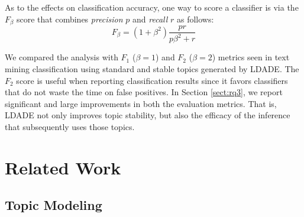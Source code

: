 \documentclass[twocolumn,5p,sort&compress]{elsarticle}
\newcommand{\tion}[1]{\ref{sect:#1}}
\theoremstyle{break}
\begin{document}
As to the effects on classification accuracy, 
one way to score a classifier is via the $F_\beta$ score that combines
{\em precision} $p$ and {\em recall} $r$ as follows:
\begin{equation}\label{eq:f}
F_{\beta} = (1+\beta^2) \frac{pr}{p\beta^2 + r}
\end{equation}

We compared the analysis with $F_1$ ($\beta=1$) and $F_2$ ($\beta=2$) metrics seen in text mining classification using standard and stable topics generated by LDADE. The $F_2$ score is useful when reporting classification results
since it favors classifiers that do not waste the time on false positives. In Section \tion{rq3}, we report 
significant and large improvements in both the evaluation metrics. That is, LDADE not only improves topic stability, but also the efficacy
of the inference that subsequently uses those topics.

\section{Related Work}
\label{sect:related}

\subsection{Topic Modeling}\label{sect:tm}
\end{document}

